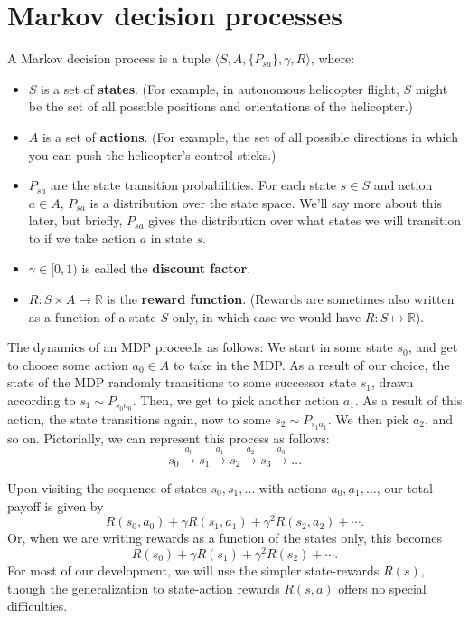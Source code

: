 \chapter{Markov decision processes}\label{sec:mdp}
A Markov decision process is a tuple $\langle S,A,\{P_{sa}\},\gamma,R\rangle$, where: %
\begin{itemize}
    \item $S$ is a set of \textbf{states}. (For example, in autonomous helicopter flight, $S$
    might be the set of all possible positions and orientations of the helicopter.)
    \item $A$ is a set of \textbf{actions}. (For example, the set of all possible directions in
    which you can push the helicopter's control sticks.)
    \item $P_{sa}$ are the state transition probabilities. For each state $s \in S$ and
    action $a \in A$, $P_{sa}$ is a distribution over the state space. We'll say more
    about this later, but briefly, $P_{sa}$ gives the distribution over what states
    we will transition to if we take action $a$ in state $s$.
    \item $\gamma \in [0,1)$ is called the \textbf{discount factor}.
    \item $R : S \times A \mapsto \mathbb R$ is the \textbf{reward function}. (Rewards are sometimes also
    written as a function of a state $S$ only, in which case we would have $R : S \mapsto \mathbb R$).
\end{itemize}

The dynamics of an MDP proceeds as follows: We start in some state $s_0$,
and get to choose some action $a_0 \in A$ to take in the MDP. As a result of our
choice, the state of the MDP randomly transitions to some successor state
$s_1$, drawn according to $s_1 \sim P_{s_0a_0}$. Then, we get to pick another action $a_1$.
As a result of this action, the state transitions again, now to some $s_2 \sim P_{s_1 a_1}$.
We then pick $a_2$, and so on. Pictorially, we can represent this process as follows:
\[
s_0 \overset{a_0}{\longrightarrow} s_1 \overset{a_1}{\longrightarrow} s_2 \overset{a_2}{\longrightarrow} s_3 \overset{a_3}{\longrightarrow} \ldots
\]

Upon visiting the sequence of states $s_0,s_1,\ldots$ with actions $a_0, a_1,\ldots$, our
total payoff is given by
\[
    R(s_0,a_0) + \gamma R(s_1,a_1) + \gamma^2 R(s_2,a_2) + \cdots.
\]
Or, when we are writing rewards as a function of the states only, this becomes
\[
    R(s_0) + \gamma R(s_1) + \gamma^2 R(s_2) + \cdots.
\]
For most of our development, we will use the simpler state-rewards $R(s)$,
though the generalization to state-action rewards $R(s,a)$ offers no special
difficulties.

